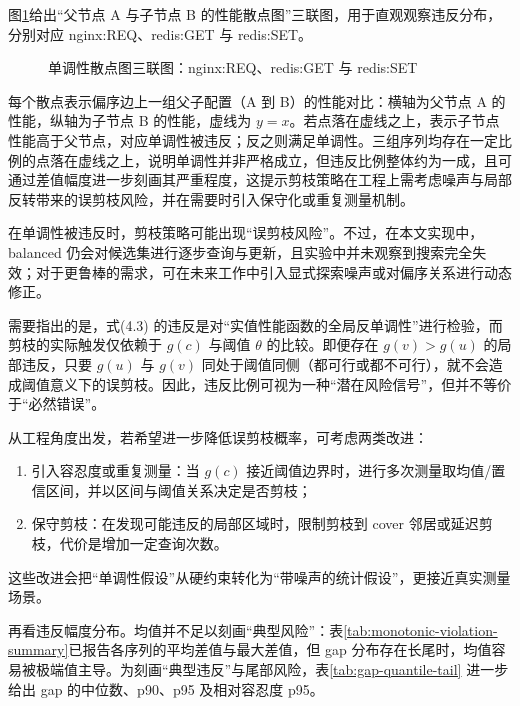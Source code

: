 \documentclass[UTF8,a4paper,12pt,twoside]{ctexart}  %
\begin{document}
图\ref{fig:hypothesis-a2b-panel}给出``父节点 A 与子节点 B 的性能散点图''三联图，用于直观观察违反分布，分别对应 nginx:REQ、redis:GET 与 redis:SET。

\begin{figure}[h]
  \centering
  
  \caption{单调性散点图三联图：nginx:REQ、redis:GET 与 redis:SET}
  \label{fig:hypothesis-a2b-panel}
\end{figure}

每个散点表示偏序边上一组父子配置（A 到
B）的性能对比：横轴为父节点 A 的性能，纵轴为子节点 B 的性能，虚线为
\(y=x\)。若点落在虚线之上，表示子节点性能高于父节点，对应单调性被违反；反之则满足单调性。三组序列均存在一定比例的点落在虚线之上，说明单调性并非严格成立，但违反比例整体约为一成，且可通过差值幅度进一步刻画其严重程度，这提示剪枝策略在工程上需考虑噪声与局部反转带来的误剪枝风险，并在需要时引入保守化或重复测量机制。

在单调性被违反时，剪枝策略可能出现``误剪枝风险''。不过，在本文实现中，balanced
仍会对候选集进行逐步查询与更新，且实验中并未观察到搜索完全失效；对于更鲁棒的需求，可在未来工作中引入显式探索噪声或对偏序关系进行动态修正。

需要指出的是，式(4.3)
的违反是对``实值性能函数的全局反单调性''进行检验，而剪枝的实际触发仅依赖于
\(g(c)\) 与阈值 \(\theta\) 的比较。即便存在 \(g(v)>g(u)\)
的局部违反，只要 \(g(u)\) 与 \(g(v)\)
同处于阈值同侧（都可行或都不可行），就不会造成阈值意义下的误剪枝。因此，违反比例可视为一种``潜在风险信号''，但并不等价于``必然错误''。

从工程角度出发，若希望进一步降低误剪枝概率，可考虑两类改进：
\begin{enumerate}
  \def\labelenumi{\arabic{enumi}.}
  \item
        引入容忍度或重复测量：当 \(g(c)\)
        接近阈值边界时，进行多次测量取均值/置信区间，并以区间与阈值关系决定是否剪枝；
  \item
        保守剪枝：在发现可能违反的局部区域时，限制剪枝到 cover
        邻居或延迟剪枝，代价是增加一定查询次数。
\end{enumerate}

这些改进会把``单调性假设''从硬约束转化为``带噪声的统计假设''，更接近真实测量场景。

再看违反幅度分布。均值并不足以刻画``典型风险''：表\ref{tab:monotonic-violation-summary}已报告各序列的平均差值与最大差值，但 gap 分布存在长尾时，均值容易被极端值主导。为刻画``典型违反''与尾部风险，表\ref{tab:gap-quantile-tail} 进一步给出 gap 的中位数、p90、p95 及相对容忍度 p95。
\end{document}

